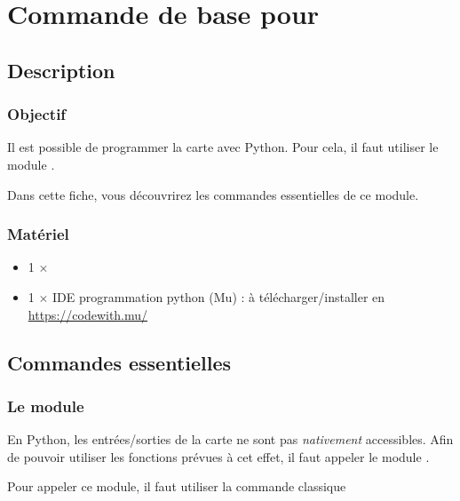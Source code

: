 
\section{Commande de base pour \mbpy}

\subsection{Description}

\subsubsection{Objectif}

\begin{formule}
Il est possible de programmer la carte \mb avec Python. Pour cela, il faut utiliser le module \mb.

Dans cette fiche, vous découvrirez les commandes essentielles de ce module.
\end{formule}


\subsubsection{Matériel}
\begin{itemize}
    \item 1 $\times$ \matosMb
    \item 1 $\times$ IDE programmation python (Mu) : à télécharger/installer en \href{cliquant ici}{https://codewith.mu/}
\end{itemize}




\subsection{Commandes essentielles}

%
%


\subsubsection{Le module }

En Python, les entrées/sorties de la carte \mb ne sont pas \textit{nativement} accessibles. Afin de pouvoir utiliser les fonctions prévues à cet effet, il faut appeler le module .\par
Pour appeler ce module, il faut utiliser la commande classique 
    
